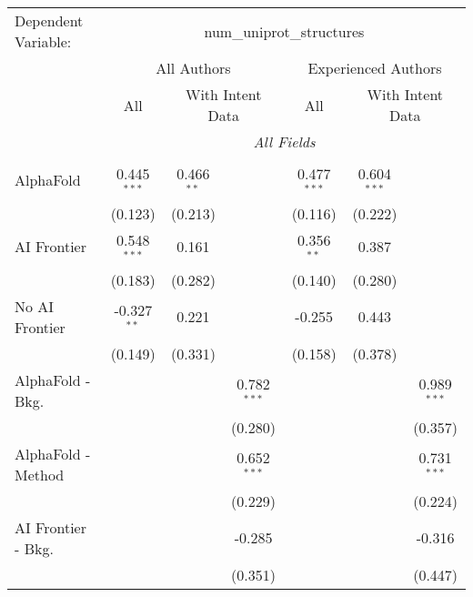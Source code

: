 \begingroup
\centering
\begin{tabular}{lcccccc}
   \tabularnewline \midrule \midrule
   Dependent Variable: & \multicolumn{6}{c}{num\_uniprot\_structures}\\
 & \multicolumn{3}{c}{All Authors} & \multicolumn{3}{c}{Experienced Authors} \\
\cmidrule(lr){2-4} \cmidrule(lr){5-7}
 & \multicolumn{1}{c}{All} & \multicolumn{2}{c}{With Intent Data} & \multicolumn{1}{c}{All} & \multicolumn{2}{c}{With Intent Data} \\
\cmidrule(lr){2-2} \cmidrule(lr){3-4} \cmidrule(lr){5-5} \cmidrule(lr){6-7}
 & \multicolumn{6}{c}{\textit{All Fields}} \\ \\
   AlphaFold               & 0.445$^{***}$ & 0.466$^{**}$ &               & 0.477$^{***}$ & 0.604$^{***}$ &   \\   
                           & (0.123)       & (0.213)      &               & (0.116)       & (0.222)       &   \\   
   AI Frontier             & 0.548$^{***}$ & 0.161        &               & 0.356$^{**}$  & 0.387         &   \\   
                           & (0.183)       & (0.282)      &               & (0.140)       & (0.280)       &   \\   
   No AI Frontier          & -0.327$^{**}$ & 0.221        &               & -0.255        & 0.443         &   \\   
                           & (0.149)       & (0.331)      &               & (0.158)       & (0.378)       &   \\   
   AlphaFold - Bkg.        &               &              & 0.782$^{***}$ &               &               & 0.989$^{***}$\\   
                           &               &              & (0.280)       &               &               & (0.357)\\   
   AlphaFold - Method      &               &              & 0.652$^{***}$ &               &               & 0.731$^{***}$\\   
                           &               &              & (0.229)       &               &               & (0.224)\\   
   AI Frontier - Bkg.      &               &              & -0.285        &               &               & -0.316\\   
                           &               &              & (0.351)       &               &               & (0.447)\\   

\end{tabular}
